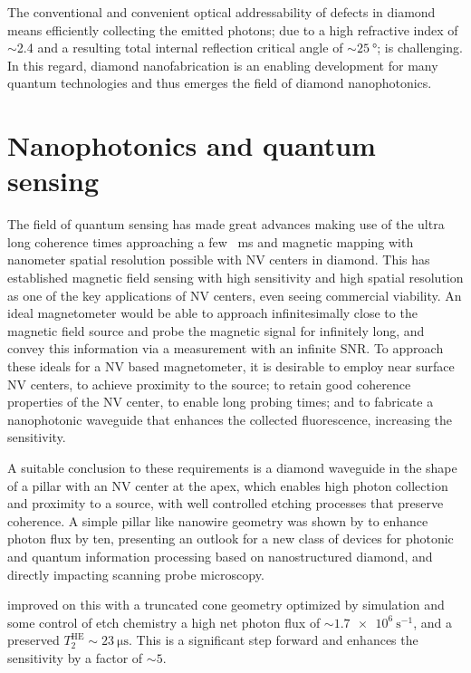 The conventional and convenient optical addressability of defects in diamond means efficiently collecting the emitted photons; due to a high refractive index of $\sim$2.4 and a resulting total internal reflection critical angle of $\sim\qty{25}{\degree}$\cite{zhuMulticoneDiamondWaveguides2023a}; is challenging. In this regard, diamond nanofabrication is an enabling development for many quantum technologies and thus emerges the field of diamond nanophotonics\cite{andoSmoothHighrateReactive2002, baynTriangularNanobeamPhotonic2011}.

\section{Nanophotonics and quantum sensing}

The field of quantum sensing has made great advances making use of the ultra long coherence times approaching a few \qty{}{ms}\cite{balasubramanianUltralongSpinCoherence2009} and magnetic mapping with nanometer spatial resolution\cite{appelFabricationAllDiamond2016} possible with \gls{NV} centers in diamond. This has established magnetic field sensing with high sensitivity and high spatial resolution as one of the key applications of \gls{NV} centers, even seeing commercial viability. An ideal magnetometer would be able to approach infinitesimally close to the magnetic field source and probe the magnetic signal for infinitely long, and convey this information via a measurement with an infinite \gls{SNR}. To approach these ideals for a \gls{NV} based magnetometer, it is desirable to employ near surface \gls{NV} centers, to achieve proximity to the source; to retain good coherence properties of the \gls{NV} center, to enable long probing times; and to fabricate a nanophotonic waveguide that enhances the collected fluorescence, increasing the sensitivity.

A suitable conclusion to these requirements is a diamond waveguide in the shape of a pillar with an \gls{NV} center at the apex, which enables high photon collection and proximity to a source, with well controlled etching processes that preserve coherence. A simple pillar like nanowire geometry was shown by \textcite{babinecDiamondNanowireSinglephoton2010} to enhance photon flux by ten, presenting an outlook for a new class of devices for photonic and quantum information processing based on nanostructured diamond, and directly impacting scanning probe microscopy. 

\textcite{momenzadehNanoengineeredDiamondWaveguide2015} improved on this with a truncated cone geometry optimized by simulation and some control of etch chemistry a high net photon flux of $\sim\qty{1.7e6}{\second^{-1}}$, and a preserved $T_2^{\text{HE}}\sim\qty{23}{\micro\second}$. This is a significant step forward and enhances the sensitivity by a factor of $\sim 5$.

